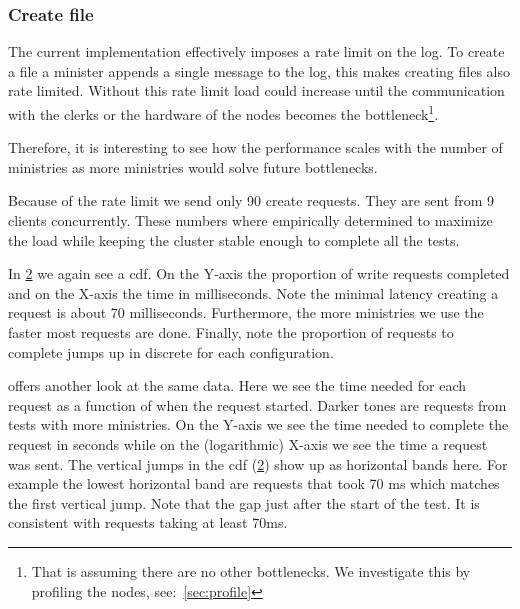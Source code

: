 \begin{figure}[htbp]
	\centering
	
	\caption{}
	\label{fig:ls_cdf}
\end{figure}

\clearpage{}
\subsubsection{Create file}
The current implementation effectively imposes a rate limit on the log. To create a file a minister appends a single message to the log, this makes creating files also rate limited. Without this rate limit load could increase until the communication with the clerks or the hardware of the nodes becomes the bottleneck\footnote{That is assuming there are no other bottlenecks. We investigate this by profiling the nodes, see:~\cref{sec:profile}}. 

Therefore, it is interesting to see how the performance scales with the number of ministries as more ministries would  solve future bottlenecks.

Because of the rate limit we send only 90 create requests. They are sent from 9 clients concurrently. These numbers where empirically determined to maximize the load while keeping the cluster stable enough to complete all the tests.

In \cref{fig:touch} we again see a \ac{cdf}. On the Y-axis the proportion of write requests completed and on the X-axis the time in milliseconds. Note the minimal latency creating a request is about 70 milliseconds. Furthermore, the more ministries we use the faster most requests are done. Finally, note the proportion of requests to complete jumps up in discrete for each configuration.

 offers another look at the same data. Here we see the time needed for each request as a function of when the request started. Darker tones are requests from tests with more ministries. On the Y-axis we see the time needed to complete the request in seconds while on the (logarithmic) X-axis we see the time a request was sent. The vertical jumps in the \ac{cdf} (\cref{fig:touch}) show up as horizontal bands here. For example the lowest horizontal band are requests that took 70 ms which matches the first vertical jump. Note that the gap just after the start of the test. It is consistent with requests taking at least 70ms.

\begin{figure}[htbp]
	\centering
	
	\caption{}
	\label{fig:touch}
\end{figure}

